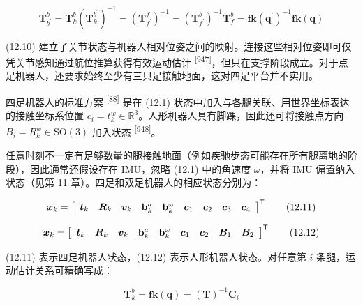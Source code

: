 \begin{equation}
\pmb {T} _ {b ^ {\prime}} ^ {b} = \pmb {T} _ {k} ^ {b} (\pmb {T} _ {k} ^ {b ^ {\prime}}) ^ {- 1} = (\pmb {T} _ {f ^ {\prime}} ^ {f}) ^ {- 1} = (\pmb {T} _ {f ^ {\prime}} ^ {b}) ^ {- 1} \pmb {T} _ {f} ^ {b} = \mathbf {f k} (\pmb {q} ^ {\prime}) ^ {- 1} \mathbf {f k} (\pmb {q})\tag{12.10}
\end{equation}

(12.10) 建立了关节状态与机器人相对位姿之间的映射。连接这些相对位姿即可仅凭关节感知通过航位推算获得有效运动估计 \textsuperscript{[947]}，但只在支撑阶段成立。对于点足机器人，还要求始终至少有三只足接触地面，这对四足平台并不实用。

四足机器人的标准方案 \textsuperscript{[88]} 是在 (12.1) 状态中加入与各腿关联、用世界坐标表达的接触坐标系位置 $c_i=t_k^w\in\mathbb{R}^3$。人形机器人具有脚踝，因此还可将接触点方向 $B_i=R_k^w\in\mathrm{SO}(3)$ 加入状态 \textsuperscript{[948]}。

任意时刻不一定有足够数量的腿接触地面（例如疾驰步态可能存在所有腿离地的阶段），因此通常还假设存在 IMU，忽略 (12.1) 中的角速度 $\omega$，并将 IMU 偏置纳入状态（见第 11 章）。四足和双足机器人的相应状态分别为：

\begin{equation}
\boldsymbol {x} _ {k} = \left[ \begin{array}{c c c c c c c c c} \boldsymbol {t} _ {k} & \boldsymbol {R} _ {k} & \boldsymbol {v} _ {k} & \mathbf {b} _ {k} ^ {a} & \mathbf {b} _ {k} ^ {\omega} & \boldsymbol {c} _ {1} & \boldsymbol {c} _ {2} & \boldsymbol {c} _ {3} & \boldsymbol {c} _ {4} \end{array} \right] ^ {\mathsf {T}}\tag{12.11}
\end{equation}

\begin{equation}
\boldsymbol {x} _ {k} = \left[ \begin{array}{c c c c c c c c c} \boldsymbol {t} _ {k} & \boldsymbol {R} _ {k} & \boldsymbol {v} _ {k} & \mathbf {b} _ {k} ^ {a} & \mathbf {b} _ {k} ^ {\omega} & \boldsymbol {c} _ {1} & \boldsymbol {c} _ {2} & \boldsymbol {B} _ {1} & \boldsymbol {B} _ {2} \end{array} \right] ^ {\mathsf {T}}\tag{12.12}
\end{equation}

(12.11) 表示四足机器人状态，(12.12) 表示人形机器人状态。对任意第 $i$ 条腿，运动估计关系可精确写成：

\begin{equation}
\pmb {T} _ {k} ^ {b} = \mathbf {f k} (\pmb {q}) = (\pmb {T}) ^ {- 1} \pmb {C} _ {i}\tag{12.13}
\end{equation}

